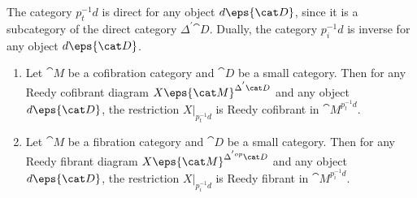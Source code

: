 The category $p_t^{-1}d$ is direct for any object $d \eps {\cat D}$, since it is a subcategory of the direct category $\Delta^{'}{\cat D}$. Dually, the category $p_i^{-1}d$ is inverse for any object $d \eps {\cat D}$.

\begin{lem}
\label{lem:restrictedreedycofibrant}
\mbox{}
\begin{enumerate}
\item
Let ${\cat M}$ be a cofibration category and ${\cat D}$ be a small category. Then for any Reedy cofibrant diagram $X \eps {\cat M}^{\Delta^{'}{\cat D}}$ and any object $d \eps {\cat D}$, the restriction $X|_{p_t^{-1}d}$ is Reedy cofibrant in ${\cat M}^{p_t^{-1}d}$.
\item
Let ${\cat M}$ be a fibration category and ${\cat D}$ be a small category. Then for any Reedy fibrant diagram $X \eps {\cat M}^{\Delta^{'op}{\cat D}}$ and any object $d \eps {\cat D}$, the restriction $X|_{p_i^{-1}d}$ is Reedy fibrant in ${\cat M}^{p_i^{-1}d}$.
\end{enumerate}
\end{lem}

